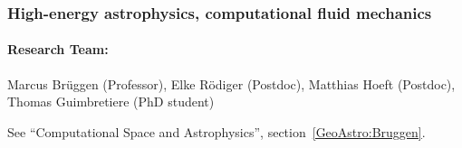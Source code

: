 %

\subsubsection{High-energy astrophysics, computational fluid
mechanics}
\paragraph{Research Team:}
Marcus Br\"uggen (Professor), Elke R\"odiger (Postdoc), Matthias Hoeft
(Postdoc), Thomas  Guimbretiere (PhD student)

\vspace{1em}

See ``Computational Space and Astrophysics'',
section~\ref{GeoAstro:Bruggen}.
